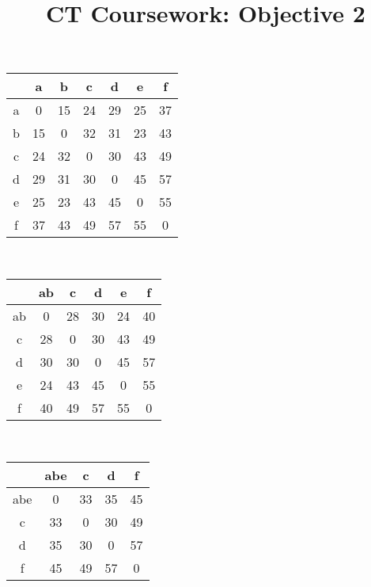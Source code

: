 \documentclass{article}
\title{CT Coursework: Objective 2}
\begin{document}
	\maketitle
	\begin{center}
		\begin{tabular}{| c | c | c | c | c | c | c |}
			 \hline
			   & a & b & c & d & e & f \\
			 \hline
			 a & 0 & \cellcolor{yellow}15 & 24 & 29 & 25 & 37 \\
			 \hline
			 b & \cellcolor{yellow}15 & 0 & 32 & 31 & 23 & 43 \\
			 \hline
			 c & 24 & 32 & 0 & 30 & 43 & 49 \\
			 \hline
			 d & 29 & 31 & 30 & 0 & 45 & 57 \\
			 \hline
			 e & 25 & 23 & 43 & 45 & 0 & 55 \\
			 \hline
			 f & 37 & 43 & 49 & 57 & 55 & 0 \\
			 \hline
		\end{tabular} \\
		\vspace{2em}
		\begin{tabular}{| c | c | c | c | c | c |}
			\hline
			& ab & c & d & e & f \\
			\hline
			ab & 0 & 28 & 30 & \cellcolor{yellow}24 & 40 \\
			\hline
			c & 28 & 0 & 30 & 43 & 49 \\
			\hline
			d & 30 & 30 & 0 & 45 & 57 \\
			\hline
			e & \cellcolor{yellow}24 & 43 & 45 & 0 & 55 \\
			\hline
			f & 40 & 49 & 57 & 55 & 0 \\
			\hline
		\end{tabular}\\
		\vspace{2em}
		\begin{tabular}{| c | c | c | c | c |}
			\hline
			& abe & c & d & f \\
			\hline
			abe & 0 & 33 & 35 & 45 \\
			\hline
			c & 33 & 0 & \cellcolor{yellow}30 & 49 \\
			\hline
			d & 35 & \cellcolor{yellow}30 & 0 & 57 \\
			\hline
			f & 45 & 49 & 57 & 0 \\
			\hline
		\end{tabular}\\
		\vspace{2em}
		\begin{tabular}{| c | c | c | c |}

\end{tabular}
\end{center}
\end{document}
